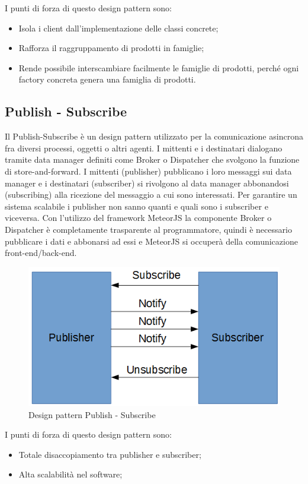 I punti di forza di questo design pattern sono:
\begin{itemize}
	\item Isola i client dall’implementazione delle classi concrete;
	\item Rafforza il raggruppamento di prodotti in famiglie;
	\item Rende possibile interscambiare facilmente le famiglie di prodotti, perché ogni factory concreta genera una famiglia di prodotti.
\end{itemize}


\subsection{Publish - Subscribe}
Il Publish-Subscribe è un design pattern utilizzato per la comunicazione asincrona fra diversi processi, oggetti o altri agenti. I mittenti e i destinatari dialogano tramite data manager definiti come Broker o Dispatcher che svolgono la funzione di store-and-forward.
I mittenti (publisher) pubblicano i loro messaggi sui data manager e i destinatari (subscriber) si rivolgono al data manager abbonandosi (subscribing) alla ricezione del messaggio a cui sono interessati. Per garantire un sistema scalabile i publisher non sanno quanti e quali sono i subscriber e viceversa. 
Con l'utilizzo del framework MeteorJS la componente Broker o Dispatcher è completamente trasparente al programmatore, quindi è necessario pubblicare i dati e abbonarsi ad essi e MeteorJS si occuperà della comunicazione front-end/back-end.
\begin{figure}[h]
	\centering
	\includegraphics[width=0.5\linewidth]{IMG/pubsub}
	\caption{Design pattern Publish - Subscribe}
\end{figure}

I punti di forza di questo design pattern sono:
\begin{itemize}
	\item Totale disaccopiamento tra publisher e subscriber;
	\item Alta scalabilità nel software;
\end{itemize}


